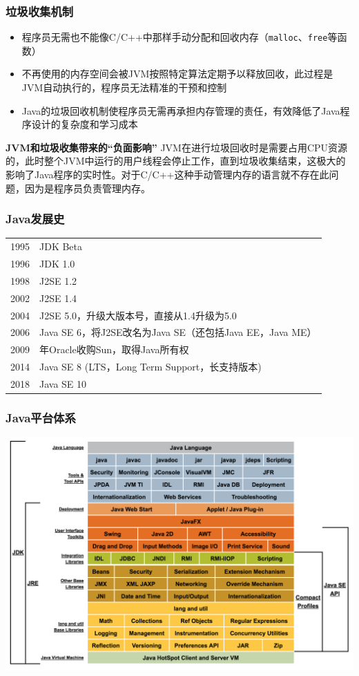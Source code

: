 \begin{frame}
  \frametitle{垃圾收集机制}
  \begin{itemize}
    \item 程序员无需也不能像C/C++中那样手动分配和回收内存（\texttt{malloc}、\texttt{free}等函数）
    \item 不再使用的内存空间会被JVM按照特定算法定期予以释放回收，此过程是JVM自动执行的，程序员无法精准的干预和控制
    \item Java的垃圾回收机制使程序员无需再承担内存管理的责任，有效降低了Java程序设计的复杂度和学习成本
  \end{itemize}
  \begin{block}{\textbf{JVM和垃圾收集带来的“负面影响”}}
    JVM在进行垃圾回收时是需要占用CPU资源的，此时整个JVM中运行的用户线程会停止工作，直到垃圾收集结束，这极大的影响了Java程序的实时性。对于C/C++这种手动管理内存的语言就不存在此问题，因为是程序员负责管理内存。
  \end{block}
\end{frame}

\begin{frame}
  \frametitle{Java发展史}
\begin{table}
\renewcommand\arraystretch{1.4}
\begin{tabular}{@{\,}r <{\hskip 2pt} !{\timeline} >{\raggedright\arraybackslash}p{9cm}}
1995 & JDK Beta\\
1996 & JDK 1.0	\\
1998 & J2SE 1.2	\\
2002 & J2SE 1.4	\\
2004 & J2SE 5.0，升级大版本号，直接从1.4升级为5.0\\
2006 & Java SE 6，将J2SE改名为Java SE（还包括Java EE，Java ME） \\
2009 & 年Oracle收购Sun，取得Java所有权\\
2014 & Java SE 8 (LTS，Long Term Support，长支持版本) \\
2018 & Java SE 10 \\
\end{tabular}
\end{table}
\end{frame}

\begin{frame}
  \frametitle{Java平台体系}
    \includegraphics[width=\textwidth]{figures/java_conceptual_diagram}
\end{frame}

